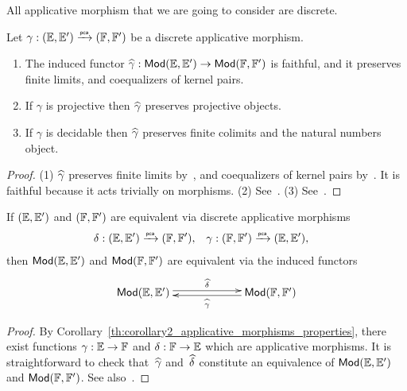 All applicative morphism that we are going to consider are
discrete.

\begin{proposition}
  \label{th:applicative_morphisms_properties}%
  Let $\gamma: ({\mathbb{E}}, {\mathbb{E}'}) \xrightarrow{\scriptscriptstyle\mathsf{pca}}{}
  ({\mathbb{F}}, {\mathbb{F}'})$ be a discrete applicative morphism.
  \begin{enumerate}
  \item[(1)] The induced functor $\widehat{\gamma}: \mathsf{Mod}({\mathbb{E}}, {\mathbb{E}'}) \to
    \mathsf{Mod}({\mathbb{F}}, {\mathbb{F}'})$ is faithful, and it preserves finite limits,
    and coequalizers of kernel pairs.
  \item[(2)] If $\gamma$ is projective then $\widehat{\gamma}$ preserves
    projective objects.
  \item[(3)] If $\gamma$ is decidable then $\widehat{\gamma}$ preserves
    finite colimits and the natural numbers object.
  \end{enumerate}
\end{proposition}

\begin{proof}
  (1) $\widehat{\gamma}$ preserves finite limits
  by~\cite[Proposition~2.2.2]{Longley:94}, and coequalizers of kernel
  pairs by~\cite[Proposition~2.2.3]{Longley:94}. It is faithful
  because it acts trivially on morphisms.
  (2) See~\cite[Theorem~2.4.12]{Longley:94}.
  (3) See~\cite[Theorem~2.4.19]{Longley:94}.
\end{proof}


\begin{theorem}
  \label{th:applicative_morphisms_tfae}%
  If $({\mathbb{E}}, {\mathbb{E}'})$ and $({\mathbb{F}}, {\mathbb{F}'})$ are equivalent via discrete
  applicative morphisms
  \begin{align*}
    \delta &: ({\mathbb{E}}, {\mathbb{E}'}) \xrightarrow{\scriptscriptstyle\mathsf{pca}}{} ({\mathbb{F}}, {\mathbb{F}'}),
    &
    \gamma &: ({\mathbb{F}}, {\mathbb{F}'}) \xrightarrow{\scriptscriptstyle\mathsf{pca}}{} ({\mathbb{E}}, {\mathbb{E}'}),
  \end{align*}
  then $\mathsf{Mod}({\mathbb{E}}, {\mathbb{E}'})$ and $\mathsf{Mod}({\mathbb{F}}, {\mathbb{F}'})$ are equivalent
  via the induced functors
  \begin{equation*}
    \xymatrix{
      **[l]{\Mod{\EE, \subEE}} \ar@<0.5ex>[r]^{\ff{\delta}}
      &
      **[r]{\Mod{\FF, \subFF}} \ar@<0.5ex>[l]^{\ff{\gamma}}
      }
  \end{equation*}
\end{theorem}

\begin{proof}
  By Corollary~\ref{th:corollary2_applicative_morphisms_properties},
  there exist functions $\gamma: {\mathbb{E}} \to {\mathbb{F}}$ and $\delta: {\mathbb{F}} \to
  {\mathbb{E}}$ which are applicative morphisms. It is straightforward to check
  that~$\widehat{\gamma}$ and~$\widehat{\delta}$ constitute an equivalence of
  $\mathsf{Mod}({\mathbb{E}}, {\mathbb{E}'})$ and $\mathsf{Mod}({\mathbb{F}}, {\mathbb{F}'})$. See also~\cite[Theorem
  2.5.6]{Longley:94}.
\end{proof}


